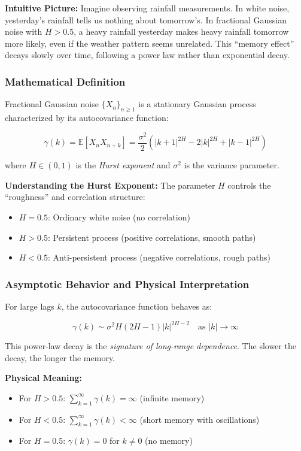 \documentclass[11pt,a4paper]{article}
\begin{document}
\textbf{Intuitive Picture:} Imagine observing rainfall measurements. In white noise, yesterday's rainfall tells us nothing about tomorrow's. In fractional Gaussian noise with $H > 0.5$, a heavy rainfall yesterday makes heavy rainfall tomorrow more likely, even if the weather pattern seems unrelated. This ``memory effect'' decays slowly over time, following a power law rather than exponential decay.

\subsubsection{Mathematical Definition}

Fractional Gaussian noise $\{X_n\}_{n \geq 1}$ is a stationary Gaussian process characterized by its autocovariance function:

\begin{equation}
\gamma(k) = \mathbb{E}[X_n X_{n+k}] = \frac{\sigma^2}{2}\left(|k+1|^{2H} - 2|k|^{2H} + |k-1|^{2H}\right)
\end{equation}

where $H \in (0,1)$ is the \emph{Hurst exponent} and $\sigma^2$ is the variance parameter.

\textbf{Understanding the Hurst Exponent:} The parameter $H$ controls the ``roughness'' and correlation structure:
\begin{itemize}
    \item $H = 0.5$: Ordinary white noise (no correlation)
    \item $H > 0.5$: Persistent process (positive correlations, smooth paths)
    \item $H < 0.5$: Anti-persistent process (negative correlations, rough paths)
\end{itemize}

\subsubsection{Asymptotic Behavior and Physical Interpretation}

For large lags $k$, the autocovariance function behaves as:

\begin{equation}
\gamma(k) \sim \sigma^2 H(2H-1) |k|^{2H-2} \quad \text{as } |k| \to \infty
\end{equation}

This power-law decay is the \emph{signature of long-range dependence}. The slower the decay, the longer the memory.

\textbf{Physical Meaning:}
\begin{itemize}
    \item For $H > 0.5$: $\sum_{k=1}^{\infty} \gamma(k) = \infty$ (infinite memory)
    \item For $H < 0.5$: $\sum_{k=1}^{\infty} \gamma(k) < \infty$ (short memory with oscillations)
    \item For $H = 0.5$: $\gamma(k) = 0$ for $k \neq 0$ (no memory)
\end{itemize}
\end{document}
